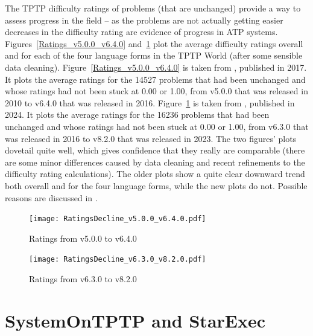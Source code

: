 \documentclass{easychair}
\begin{document}
The TPTP difficulty ratings of problems (that are unchanged) provide a way to assess progress 
in the field -- as the problems are not actually getting easier decreases in the difficulty
rating are evidence of progress in ATP systems.
Figures~\ref{Ratings_v5.0.0_v6.4.0} and~\ref{Ratings_v6.3.0_v8.2.0} plot the average difficulty
ratings overall and for each of the four language forms in the TPTP World (after some sensible
data cleaning).
Figure~\ref{Ratings_v5.0.0_v6.4.0} is taken from \cite{Sut17}, published in 2017.
It plots the average ratings for the 14527 problems that had been unchanged and whose ratings 
had not been stuck at 0.00 or 1.00, from v5.0.0 that was released in 2010 to v6.4.0 that was
released in 2016. 
Figure~\ref{Ratings_v6.3.0_v8.2.0} is taken from \cite{SK+24}, published in 2024.
It plots the average ratings for the 16236 problems that had been unchanged and whose ratings 
had not been stuck at 0.00 or 1.00, from v6.3.0 that was released in 2016 to v8.2.0 that was
released in 2023. 
The two figures’ plots dovetail quite well, which gives confidence that they really are 
comparable (there are some minor differences caused by data cleaning and recent refinements to 
the difficulty rating calculations). 
The older plots show a quite clear downward trend both overall and for the four language forms, 
while the new plots do not. 
Possible reasons are discussed in \cite{SK+24}.

\begin{figure}[t!]
\centering
\begin{minipage}[t]{.49\textwidth}
  \centering
  \texttt{[image: RatingsDecline\_v5.0.0\_v6.4.0.pdf]}
  \vspace*{-2em}
  \caption{Ratings from v5.0.0 to v6.4.0}
  \label{Ratings_v5.0.0_v6.4.0}
\end{minipage}
\begin{minipage}[t]{.49\textwidth}
  \centering
  \texttt{[image: RatingsDecline\_v6.3.0\_v8.2.0.pdf]}
  \vspace*{-2em}
  \caption{Ratings from v6.3.0 to v8.2.0}
  \label{Ratings_v6.3.0_v8.2.0}
\end{minipage}
\end{figure}


\section{SystemOnTPTP and StarExec}
\label{StarExec}
\end{document}
